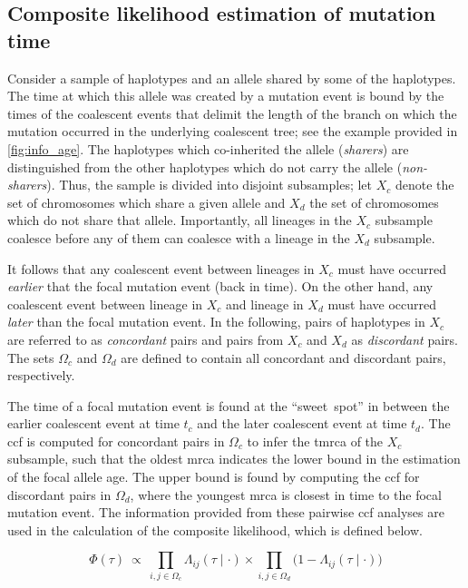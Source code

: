 %
\subsection{Composite likelihood estimation of mutation time}
%

Consider a sample of haplotypes and an allele shared by some of the haplotypes.
The time at which this allele was created by a mutation event is bound by the times of the  coalescent events that delimit the length of the branch on which the mutation occurred in the underlying coalescent tree; see the example provided in \cref{fig:info_age}.
The haplotypes which co-inherited the allele (\emph{sharers}) are distinguished from the other haplotypes which do not carry the allele (\emph{non-sharers}).
Thus, the sample is divided into  disjoint subsamples; let $X_c$ denote the set of chromosomes which share a given allele and $X_d$ the set of chromosomes which do not share that allele.
Importantly, all lineages in the $X_c$ subsample coalesce before any of them can coalesce with a lineage in the $X_d$ subsample.

%

%

It follows that any coalescent event between  lineages in $X_c$ must have occurred \emph{earlier} that the focal mutation event (back in time).
On the other hand, any coalescent event between  lineage in $X_c$ and  lineage in $X_d$ must have occurred \emph{later} than the focal mutation event.
In the following, pairs of haplotypes in $X_c$ are referred to as \emph{concordant} pairs and pairs from $X_c$ and $X_d$ as \emph{discordant} pairs.
The sets $\Omega_c$ and $\Omega_d$ are defined to contain all concordant and discordant pairs, respectively.

The time of a focal mutation event is found at the ``sweet~spot'' in between the earlier coalescent event at time $t_c$ and the later coalescent event at time $t_d$.
The \gls{ccf} is computed for concordant pairs in $\Omega_c$ to infer the \gls{tmrca} of the $X_c$ subsample, such that the oldest \gls{mrca} indicates the lower bound in the estimation of the focal allele age.
The upper bound is found by computing the \gls{ccf} for discordant pairs in $\Omega_d$, where the youngest \gls{mrca} is closest in time to the focal mutation event.
The information provided from these pairwise \gls{ccf} analyses are used in the calculation of the composite likelihood, which is defined below.

\begin{equation}\label{eq:compll}
	\Phi(\tau)
	~\propto~
	\prod_{i,j \in \Omega_c} \Lambda_{ij}(\tau\mid\cdot)
	\times
	\prod_{i,j \in \Omega_d} \big(1 - \Lambda_{ij}(\tau\mid\cdot) \big)
\end{equation}


